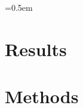 \documentclass[a4paper, twoculumn]{article}
\begin{document}
\font=0.5em  %


\twocolumn
\section*{Results}



\section*{Methods}



\end{document}
